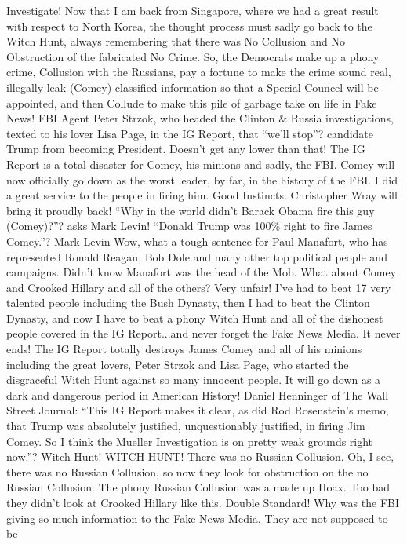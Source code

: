 Investigate! Now that I am back from Singapore, where we had a great
result with respect to North Korea, the thought process must sadly go
back to the Witch Hunt, always remembering that there was No Collusion
and No Obstruction of the fabricated No Crime. So, the Democrats make up
a phony crime, Collusion with the Russians, pay a fortune to make the
crime sound real, illegally leak (Comey) classified information so that
a Special Councel will be appointed, and then Collude to make this pile
of garbage take on life in Fake News! FBI Agent Peter Strzok, who headed
the Clinton \& Russia investigations, texted to his lover Lisa Page, in
the IG Report, that ``we'll stop''? candidate Trump from becoming
President. Doesn't get any lower than that! The IG Report is a total
disaster for Comey, his minions and sadly, the FBI. Comey will now
officially go down as the worst leader, by far, in the history of the
FBI. I did a great service to the people in firing him. Good Instincts.
Christopher Wray will bring it proudly back! ``Why in the world didn't
Barack Obama fire this guy (Comey)?''? asks Mark Levin! ``Donald Trump
was 100\% right to fire James Comey.''? Mark Levin Wow, what a tough
sentence for Paul Manafort, who has represented Ronald Reagan, Bob Dole
and many other top political people and campaigns. Didn't know Manafort
was the head of the Mob. What about Comey and Crooked Hillary and all of
the others? Very unfair! I've had to beat 17 very talented people
including the Bush Dynasty, then I had to beat the Clinton Dynasty, and
now I have to beat a phony Witch Hunt and all of the dishonest people
covered in the IG Report...and never forget the Fake News Media. It
never ends! The IG Report totally destroys James Comey and all of his
minions including the great lovers, Peter Strzok and Lisa Page, who
started the disgraceful Witch Hunt against so many innocent people. It
will go down as a dark and dangerous period in American History! Daniel
Henninger of The Wall Street Journal: ``This IG Report makes it clear,
as did Rod Rosenstein's memo, that Trump was absolutely justified,
unquestionably justified, in firing Jim Comey. So I think the Mueller
Investigation is on pretty weak grounds right now.''? Witch Hunt! WITCH
HUNT! There was no Russian Collusion. Oh, I see, there was no Russian
Collusion, so now they look for obstruction on the no Russian Collusion.
The phony Russian Collusion was a made up Hoax. Too bad they didn't look
at Crooked Hillary like this. Double Standard! Why was the FBI giving so
much information to the Fake News Media. They are not supposed to be

